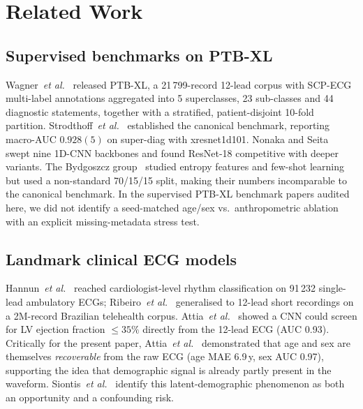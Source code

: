 \documentclass[mathematics,article,submit,pdftex]{Definitions/mdpi}
\begin{document}
\section{Related Work}\label{sec:relwork}

\subsection{Supervised benchmarks on PTB-XL}
Wagner~\textit{et al.}~\cite{Wagner2020} released PTB-XL, a 21\,799-record 12-lead corpus with SCP-ECG multi-label annotations aggregated into 5 superclasses, 23 sub-classes and 44 diagnostic statements, together with a stratified, patient-disjoint 10-fold partition. Strodthoff~\textit{et al.}~\cite{Strodthoff2021} established the canonical benchmark, reporting macro-AUC $0.928(5)$ on super-diag with xresnet1d101. Nonaka and Seita~\cite{Nonaka2021} swept nine 1D-CNN backbones and found ResNet-18 competitive with deeper variants. The Bydgoszcz group~\cite{Smigiel2021, Palczynski2022} studied entropy features and few-shot learning but used a non-standard 70/15/15 split, making their numbers incomparable to the canonical benchmark. In the supervised PTB-XL benchmark papers audited here, we did not identify a seed-matched age/sex vs.\ anthropometric ablation with an explicit missing-metadata stress test.

\subsection{Landmark clinical ECG models}
Hannun~\textit{et al.}~\cite{Hannun2019} reached cardiologist-level rhythm classification on 91\,232 single-lead ambulatory ECGs; Ribeiro~\textit{et al.}~\cite{Ribeiro2020} generalised to 12-lead short recordings on a 2M-record Brazilian telehealth corpus. Attia~\textit{et al.}~\cite{Attia2019LV} showed a CNN could screen for LV ejection fraction $\leq 35\%$ directly from the 12-lead ECG (AUC 0.93). Critically for the present paper, Attia~\textit{et al.}~\cite{Attia2019AgeSex} demonstrated that age and sex are themselves \emph{recoverable} from the raw ECG (age MAE 6.9\,y, sex AUC 0.97), supporting the idea that demographic signal is already partly present in the waveform. Siontis~\textit{et al.}~\cite{Siontis2021} identify this latent-demographic phenomenon as both an opportunity and a confounding risk.
\end{document}
